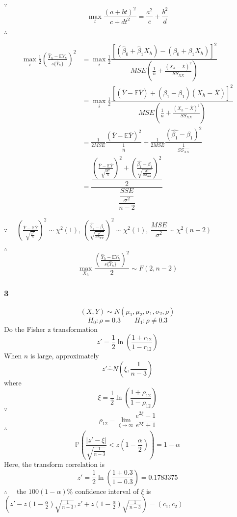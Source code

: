 \documentclass[]{article}
\begin{document}
\(\because\quad\)
\[\max\limits_{t}\dfrac{(a+bt)^2}{c+dt^2}=\dfrac{a^2}{c}+\dfrac{b^2}{d}\]

\(\therefore\quad\)

\begin{align*}
\max\limits_i\frac{1}{2}\left(\frac{\hat{Y}_h-\mathbb{E}Y_h}{s\{\hat{Y}_h\}}\right)^2&=\max\limits_i\frac{1}{2} \dfrac{[(\hat{\beta}_0+\hat{\beta}_1X_h)-(\beta_0+\beta_1X_h)]^2}{MSE\left(\frac{1}{n}+\frac{(X_h-\overline{X})^2}{SS_{XX}}\right)}\\
&=\max\limits_i\frac{1}{2} \dfrac{[(\overline{Y}-\mathbb{E}\overline{Y})+(\hat{\beta_1}-\beta_1)(X_h-\overline{X})]^2}{MSE\left(\frac{1}{n}+\frac{(X_h-\overline{X})^2}{SS_{XX}}\right)}\\
&=\frac{1}{2MSE}\dfrac{(\overline{Y}-\mathbb{E}\overline{Y})^2}{\frac{1}{n}}+\frac{1}{2MSE}\dfrac{(\hat{\beta_1}-\beta_1)^2}{\frac{1}{SS_{XX}}}\\
&=\dfrac{\dfrac{\left(\frac{\overline{Y}-\mathbb{E}\overline{Y}}{\sqrt{\frac{\sigma^2}{n}}}\right)^2+\left(\frac{\hat{\beta_1}-\beta_1}{\sqrt{\frac{\sigma^2}{SS_{XX}}}}\right)^2}{2}}{\dfrac{\dfrac{SSE}{\sigma^2}}{n-2}}
\end{align*}

\(\because\quad\)
\(\left(\frac{\overline{Y}-\mathbb{E}\overline{Y}}{\sqrt{\frac{\sigma^2}{n}}}\right)^2\sim\chi^2(1),\ \left(\frac{\hat{\beta_1}-\beta_1}{\sqrt{\frac{\sigma^2}{SS_{XX}}}}\right)^2\sim\chi^2(1),\ \dfrac{MSE}{\sigma^2}\sim\chi^2(n-2)\)

\(\therefore\quad\)
\[\max\limits_{X_h}\frac{\left(\frac{\hat{Y}_h-\mathbb{E}Y_h}{s\{\hat{Y}_h\}}\right)^2}{2}\sim F(2,n-2)\]

\subsubsection{3}\label{section}

\[(X,Y)\sim N(\mu_1,\mu_2,\sigma_1,\sigma_2,\rho)\]
\[H_0:\rho=0.3\qquad H_1:\rho\neq 0.3\] Do the Fisher z
transformation\[z'=\frac{1}{2}\ln\left(\dfrac{1+r_{12}}{1-r_{12}}\right)\]
When \(n\) is large, approximately
\[z'\overset{\cdot}{\sim} N\left(\xi,\dfrac{1}{n-3}\right)\] where
\[\xi=\dfrac{1}{2}\ln\left(\dfrac{1+\rho_{12}}{1-\rho_{12}}\right)\]
\(\because\quad\)
\[\rho_{12}=\lim\limits_{\xi\rightarrow\infty}\dfrac{e^{2\xi}-1}{e^{2\xi}+1}\]
\(\therefore\quad\)
\[\mathbb{P}\left(\dfrac{|z'-\xi|}{\sqrt{\frac{1}{n-3}}}<z(1-\frac{\alpha}{2})\right)=1-\alpha\]
Here, the transform correlation is
\[z'=\dfrac{1}{2}\ln\left(\dfrac{1+0.3}{1-0.3}\right)=0.1783375\]
\(\therefore\quad\) the \(100(1-\alpha)\%\) confidence interval of
\(\xi\) is
\((z'-z(1-\frac{\alpha}{2})\sqrt{\frac{1}{n-3}},z'+z(1-\frac{\alpha}{2})\sqrt{\frac{1}{n-3}})=(c_1,c_2)\)
\end{document}
